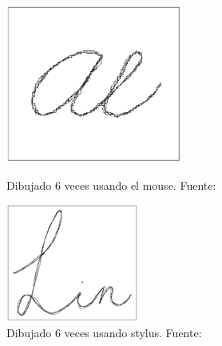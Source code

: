 \begin{anexos}
\begin{figure}[H]
		\label{smudge-screen}
\end{figure} 

\begin{figure}[H]
	\centering
	\begin{minipage}{0.5\linewidth}  %
		\centering
		\includegraphics[width=0.7\linewidth]{mouse.png} %
		\caption{Dibujado 6 veces usando el mouse. Fuente: \cite{lin2009free}}
		\label{free-draw-train-mouse}
	\end{minipage}%
	\hfill
	\begin{minipage}{0.5\linewidth} %
		\centering
		\includegraphics[width=0.7\linewidth]{stylus.png} %
		\caption{Dibujado 6 veces usando stylus. Fuente: \cite{lin2009free}}
		\label{free-draw-train-stylus}
	\end{minipage}
	

\end{figure}
\end{anexos}
